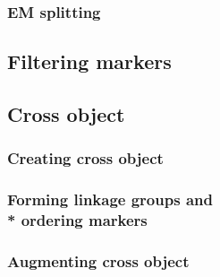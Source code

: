 \documentclass{article}
\begin{document}
\begin{multicols}{2}
\subsubsection{EM splitting}
\blindtext
\subsection{Filtering markers}
\blindtext
\subsection{Cross object}
\blindtext[2]
\subsubsection{Creating cross object}
\blindtext
\subsubsection{Forming linkage groups and \\* ordering markers}
\blindtext
\subsubsection{Augmenting cross object}
\blindtext
\end{multicols}
\newpage
\end{document}

